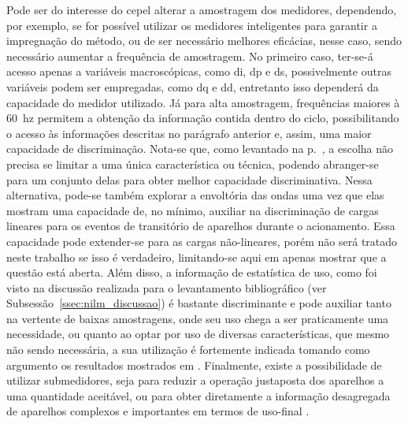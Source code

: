 Pode ser do interesse do \acs{cepel} alterar a amostragem dos
medidores, dependendo, por exemplo, se for possível utilizar os
medidores inteligentes para garantir a impregnação do método, ou de
ser necessário melhores eficácias, nesse caso, sendo necessário
aumentar a frequência de amostragem. No primeiro caso,
ter-se-á acesso apenas a variáveis macroscópicas, como \acs{di}, \acs{dp}
e \acs{ds}, possivelmente outras variáveis podem ser empregadas, como
\acs{dq} e \acs{dd}, entretanto isso dependerá da capacidade do
medidor utilizado. Já para alta amostragem, 
frequências maiores à 60~\acs{hz} permitem a obtenção da informação
contida dentro do ciclo, possibilitando o acesso às informações
descritas no parágrafo anterior e, assim, uma maior capacidade de
discriminação. Nota-se que, como levantado na
p.~\pageref{nilm:multiplas_tecnicas}, a escolha não precisa se limitar
a uma única característica ou técnica, podendo abranger-se para um
conjunto delas para obter melhor capacidade discriminativa. Nessa
alternativa, pode-se também explorar a envoltória das ondas uma vez que
elas mostram uma capacidade de, no mínimo, auxiliar na discriminação
de cargas lineares para os eventos de transitório de aparelhos durante
o acionamento. Essa capacidade pode extender-se para as
cargas não-lineares, porém não será tratado neste trabalho se isso
é verdadeiro, limitando-se aqui em apenas mostrar que a questão
está aberta. Além disso, a informação de estatística de uso, como foi
visto na discussão realizada para o levantamento bibliográfico (ver
Subsessão~\ref{ssec:nilm_discussao}) é bastante discriminante e pode
auxiliar tanto na vertente de baixas amostragens, onde seu uso chega a
ser praticamente uma necessidade, ou quanto ao optar por uso de
diversas características, que mesmo não sendo necessária, a sua
utilização é fortemente indicada tomando como argumento os resultados
mostrados em
\cite{nilm_zeifman_vast_2011,nilm_zeifman_vastext_approach_2012,
nilm_zeifman_statistical_vastext_1stws_2012,
nilm_zeifman_vast_hisample_pdfmerge_2011,
nilm_zeifman_statistical_naive_enduses_2013}. Finalmente, existe a
possibilidade de utilizar submedidores, seja para reduzir a operação
justaposta dos aparelhos a uma quantidade aceitável, ou para obter
diretamente a informação desagregada de aparelhos complexos e
importantes em termos de uso-final
\cite{seminilm_ihome_tomek_2012,seminilm_fhmm_empiricalnmeter_2013,
seminilm_berges_multisensor_2010}.



